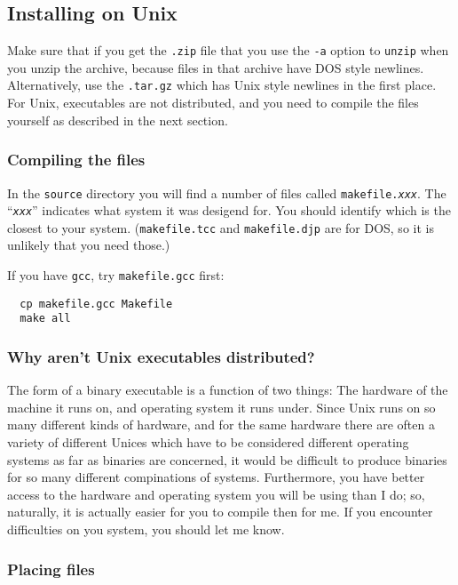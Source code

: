 \documentclass[%
	11pt,
        a4paper,
        twoside]{workrep}
\newcommand*{\cmd}[1]{\texttt{#1}}		%
\newcommand*{\file}[1]{\texttt{#1}}		%
\newcommand*{\opt}[1]{\texttt{#1}}		%
\begin{document}
\subsection{Installing on Unix}

Make sure that if you get the \file{.zip} file that you use the
\opt{-a} option to \cmd{unzip} when you unzip the archive, because
files in that archive have DOS style newlines.  Alternatively, use
the \file{.tar.gz} which has Unix style newlines in the first place.
For Unix, executables are not distributed, and you need to compile
the files yourself as described in the next section.

\subsubsection{Compiling the files}\label{sec:compile}

In the \file{source} directory you will find a number of files called
\file{makefile.\textit{xxx}}.  The ``\texttt{\itshape xxx}''
indicates what system it was desigend for.  You should identify which
is the closest to your system.  (\file{makefile.tcc} and
\file{makefile.djp} are for DOS, so it is unlikely that you need
those.)

If you have \cmd{gcc}, try \file{makefile.gcc} first:
\begin{verbatim}
  cp makefile.gcc Makefile
  make all
\end{verbatim}

\subsubsection{Why aren't Unix executables distributed?}

The form of a binary executable is a function of two things:  The hardware
of the machine it runs on, and operating system it runs under.  Since
Unix runs on so many different kinds of hardware, and for the same hardware
there are often a variety of different Unices which have to be considered
different operating systems as far as binaries are concerned, it would be
difficult to produce binaries for so many different compinations of systems.
Furthermore, you have better access to the hardware and operating system
you will be using than I do; so, naturally, it is actually easier for
you to compile then for me.  If you encounter difficulties on you system,
you should let me know.

\subsubsection{Placing files}
\end{document}
